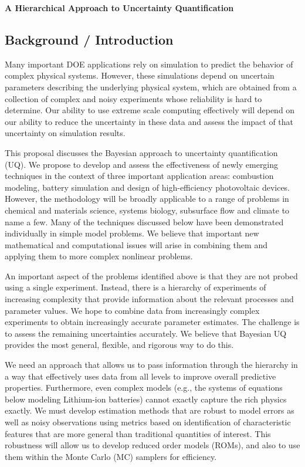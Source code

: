 \documentclass[11pt]{article}
\newcommand{\MarginPar}[1]{\marginpar{%
\vskip-\baselineskip %
\raggedright\tiny\sffamily
\hrule\smallskip{\color{red}#1}\par\smallskip\hrule}}
\begin{document}
\begin{center}
{\large{\textbf{A Hierarchical Approach to Uncertainty Quantification}}}
\end{center}

\subsection*{Background / Introduction}

Many important DOE applications rely on simulation to predict the behavior of complex physical systems.
However, these simulations depend on uncertain parameters describing the underlying physical system,
which are obtained from a collection of
complex and noisy experiments whose reliability is hard to determine. 
Our ability to use extreme scale computing effectively will depend on our ability to reduce the
uncertainty in these data and assess the impact of that uncertainty on simulation results.

This proposal discusses the Bayesian approach to uncertainty quantification (UQ).
We propose to develop and assess the effectiveness of newly emerging techniques in the 
context of three important application areas: combustion modeling, 
battery simulation and design of high-efficiency photovoltaic devices.
\MarginPar{a bit more detail here?}
However, the methodology will be broadly applicable to a
range of problems in chemical and materials science, systems biology, subsurface flow and climate 
to name a few.
Many of the techniques discussed below have been demonstrated individually in simple model problems.
We believe that important new mathematical and computational issues will arise in combining them 
and applying them to more complex nonlinear problems.

An important aspect of the problems identified above is that they are not probed using a 
single experiment.  
Instead, there is a hierarchy of experiments of increasing complexity that provide 
information about the relevant processes and parameter values.
We hope to combine data from increasingly complex experiments to obtain increasingly accurate
parameter estimates.
The challenge is to assess the remaining uncertainties accurately.
We believe that Bayesian UQ provides the most general, flexible, and rigorous way to do this.

We need an approach that allows us to pass information through the hierarchy in a way that 
effectively uses data from all levels to improve overall predictive properties.
Furthermore, even complex models (e.g., the systems of equations below modeling Lithium-ion batteries)
cannot exactly capture the rich physics exactly.
We must develop estimation methods that are robust to model errors as well as noisy observations
using metrics based on identification of characteristic features that are more general than
traditional quantities of interest.
This robustness will allow us to develop reduced order models (ROMs), and also to use them 
within the Monte Carlo (MC) samplers for efficiency. 
\end{document}
